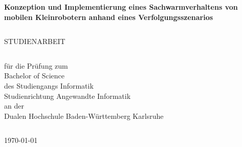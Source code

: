 \pagestyle{scrheadings}
\clearscrheadfoot
{}
\begin{verbatim}
\end{verbatim}
\begin{center}
	\large{\textbf{Konzeption und Implementierung eines Sachwarmverhaltens von mobilen Kleinrobotern anhand eines Verfolgungsszenarios}}
\end{center}
\begin{verbatim}

\end{verbatim}
\begin{center}
	\large{STUDIENARBEIT}
\end{center}
\begin{verbatim}

\end{verbatim}
\begin{center}
	für die Prüfung zum\\
	\medskip
	Bachelor of Science\\
	\medskip
	des Studiengangs Informatik\\
	Studienrichtung Angewandte Informatik\\
	\medskip
	an der\\
	\medskip
	Dualen Hochschule Baden-Württemberg Karlsruhe\\
\end{center}
\begin{verbatim}
\end{verbatim}
\begin{center}
	\today
\end{center}
\begin{verbatim}





\end{verbatim}	
